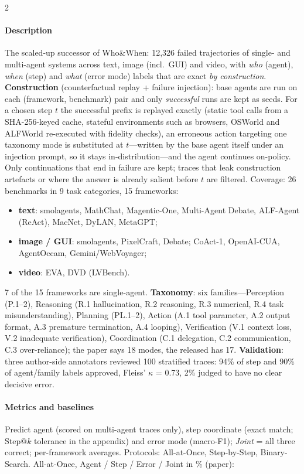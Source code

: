 \begin{multicols}{2}
\paragraph{Description} The scaled-up successor of Who\&When: 12,326 failed trajectories of single- and multi-agent systems across text, image (incl.\ GUI) and video, with \emph{who} (agent), \emph{when} (step) and \emph{what} (error mode) labels that are exact \emph{by construction}. \textbf{Construction} (counterfactual replay + failure injection): base agents are run on each (framework, benchmark) pair and only \emph{successful} runs are kept as seeds. For a chosen step $t$ the successful prefix is replayed exactly (static tool calls from a SHA-256-keyed cache, stateful environments such as browsers, OSWorld and ALFWorld re-executed with fidelity checks), an erroneous action targeting one taxonomy mode is substituted at $t$---written by the base agent itself under an injection prompt, so it stays in-distribution---and the agent continues on-policy. Only continuations that end in failure are kept; traces that leak construction artefacts or where the answer is already salient before $t$ are filtered. Coverage: 26 benchmarks in 9 task categories, 15 frameworks:
\begin{itemize}
\item \textbf{text}: smolagents, MathChat, Magentic-One, Multi-Agent Debate, ALF-Agent (ReAct), MacNet, DyLAN, MetaGPT;
\item \textbf{image / GUI}: smolagents, PixelCraft, Debate; CoAct-1, OpenAI-CUA, AgentOccam, Gemini/WebVoyager;
\item \textbf{video}: EVA, DVD (LVBench).
\end{itemize}
7 of the 15 frameworks are single-agent. \textbf{Taxonomy}: six families---Perception (P.1--2), Reasoning (R.1 hallucination, R.2 reasoning, R.3 numerical, R.4 task misunderstanding), Planning (PL.1--2), Action (A.1 tool parameter, A.2 output format, A.3 premature termination, A.4 looping), Verification (V.1 context loss, V.2 inadequate verification), Coordination (C.1 delegation, C.2 communication, C.3 over-reliance); the paper says 18 modes, the released  has 17. \textbf{Validation}: three author-side annotators reviewed 100 stratified traces: 94\% of step and 90\% of agent/family labels approved, Fleiss' $\kappa$ = 0.73, 2\% judged to have no clear decisive error.

\paragraph{Metrics and baselines} Predict agent (scored on multi-agent traces only), step coordinate (exact match; Step@$k$ tolerance in the appendix) and error mode (macro-F1); \emph{Joint} = all three correct; per-framework averages. Protocols: All-at-Once, Step-by-Step, Binary-Search. All-at-Once, Agent / Step / Error / Joint in \% (paper):


\end{multicols}
